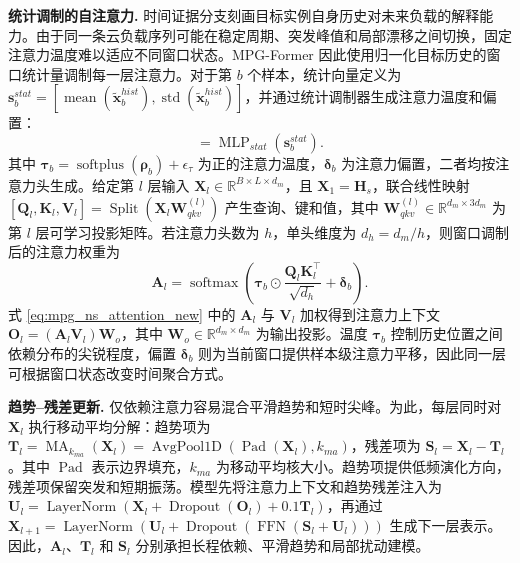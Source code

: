 \documentclass[UTF8]{ctexart}
\begin{document}
\noindent\textbf{统计调制的自注意力.}
时间证据分支刻画目标实例自身历史对未来负载的解释能力。由于同一条云负载序列可能在稳定周期、突发峰值和局部漂移之间切换，固定注意力温度难以适应不同窗口状态。MPG-Former 因此使用归一化目标历史的窗口统计量调制每一层注意力。对于第 $b$ 个样本，统计向量定义为 $\mathbf s^{stat}_b=[\operatorname{mean}(\tilde{\mathbf x}^{hist}_b),\operatorname{std}(\tilde{\mathbf x}^{hist}_b)]$，并通过统计调制器生成注意力温度和偏置：
\begin{equation}
    [\boldsymbol{\rho}_b,\boldsymbol{\delta}_b]=\operatorname{MLP}_{stat}(\mathbf s^{stat}_b).
    \label{eq:mpg_stat_control_new}
\end{equation}
其中 $\boldsymbol{\tau}_b=\operatorname{softplus}(\boldsymbol{\rho}_b)+\epsilon_{\tau}$ 为正的注意力温度，$\boldsymbol{\delta}_b$ 为注意力偏置，二者均按注意力头生成。给定第 $l$ 层输入 $\mathbf X_l\in\mathbb R^{B\times L\times d_m}$，且 $\mathbf X_1=\mathbf H_s$，联合线性映射 $[\mathbf Q_l,\mathbf K_l,\mathbf V_l]=\operatorname{Split}(\mathbf X_l\mathbf W_{qkv}^{(l)})$ 产生查询、键和值，其中 $\mathbf W_{qkv}^{(l)}\in\mathbb R^{d_m\times 3d_m}$ 为第 $l$ 层可学习投影矩阵。若注意力头数为 $h$，单头维度为 $d_h=d_m/h$，则窗口调制后的注意力权重为
\begin{equation}
    \mathbf A_l=\operatorname{softmax}\!\left(\boldsymbol{\tau}_b\odot\frac{\mathbf Q_l\mathbf K_l^{\top}}{\sqrt{d_h}}+\boldsymbol{\delta}_b\right).
    \label{eq:mpg_ns_attention_new}
\end{equation}
式 \eqref{eq:mpg_ns_attention_new} 中的 $\mathbf A_l$ 与 $\mathbf V_l$ 加权得到注意力上下文 $\mathbf O_l=(\mathbf A_l\mathbf V_l)\mathbf W_o$，其中 $\mathbf W_o\in\mathbb R^{d_m\times d_m}$ 为输出投影。温度 $\boldsymbol{\tau}_b$ 控制历史位置之间依赖分布的尖锐程度，偏置 $\boldsymbol{\delta}_b$ 则为当前窗口提供样本级注意力平移，因此同一层可根据窗口状态改变时间聚合方式。

\noindent\textbf{趋势--残差更新.}
仅依赖注意力容易混合平滑趋势和短时尖峰。为此，每层同时对 $\mathbf X_l$ 执行移动平均分解：趋势项为 $\mathbf T_l=\operatorname{MA}_{k_{ma}}(\mathbf X_l)=\operatorname{AvgPool1D}(\operatorname{Pad}(\mathbf X_l),k_{ma})$，残差项为 $\mathbf S_l=\mathbf X_l-\mathbf T_l$。其中 $\operatorname{Pad}$ 表示边界填充，$k_{ma}$ 为移动平均核大小。趋势项提供低频演化方向，残差项保留突发和短期振荡。模型先将注意力上下文和趋势残差注入为 $\mathbf U_l=\operatorname{LayerNorm}(\mathbf X_l+\operatorname{Dropout}(\mathbf O_l)+0.1\mathbf T_l)$，再通过 $\mathbf X_{l+1}=\operatorname{LayerNorm}(\mathbf U_l+\operatorname{Dropout}(\operatorname{FFN}(\mathbf S_l+\mathbf U_l)))$ 生成下一层表示。因此，$\mathbf A_l$、$\mathbf T_l$ 和 $\mathbf S_l$ 分别承担长程依赖、平滑趋势和局部扰动建模。
\end{document}
